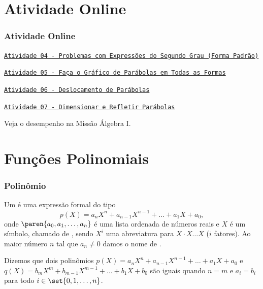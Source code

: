 \documentclass[10pt]{beamer}
\begin{document}
\section{Atividade Online}
\begin{frame}
\frametitle{Atividade Online} 

\href{https://pt.khanacademy.org/math/algebra-home/alg-quadratics/quad-standard-form-alg/e/key-features-quadratics}
{{\tt Atividade 04 - Problemas com Expressões do Segundo Grau (Forma
Padrão)}}

\href{https://pt.khanacademy.org/math/algebra-home/alg-quadratics/alg-features-of-quadratic-functions/e/graphing_parabolas_2}
{{\tt Atividade 05 - Faça o Gráfico de Parábolas em Todas as
Formas}}

\href{https://pt.khanacademy.org/math/algebra-home/alg-quadratics/alg-transforming-quadratic-functions/e/shift-parabolas}
{{\tt Atividade 06 - Deslocamento de Parábolas}}

\href{https://pt.khanacademy.org/math/algebra-home/alg-quadratics/alg-transforming-quadratic-functions/e/stretch-and-shrink-parabolas}
{{\tt Atividade 07 - Dimensionar e Refletir Parábolas}}

Veja o desempenho na Missão Álgebra I.


\end{frame}



\section{Funções Polinomiais}
\begin{frame}
\frametitle{Polinômio} 

\begin{definicao}
Um  é uma expressão formal do tipo
$$p(X) = a_n X^n+ a_{n-1} X^{n-1} + \dots + a_1X + a_0,$$
onde $\paren{a_0, a_1 , \dots , a_n}$ é uma lista ordenada de
números reais e $X$ é um símbolo, chamado de ,
sendo $X^i$ uma abreviatura para $X\cdot X  \dots  X$ ($i$ fatores).
Ao maior número $n$ tal que $a_n \neq 0$ damos o nome de .
\end{definicao}\pause

Dizemos que dois polinômios $p(X) = a_n X^n+ a_{n-1} X^{n-1} + \dots
+ a_1X + a_0$ e $q(X) = b_m X^m + b_{m-1} X^{m-1} + \dots + b_1X +
b_0$ são iguais quando $n=m$ e $a_i = b_i$ para todo $i \in \set{0,
1, \dots , n}$.

\end{frame}
\end{document}
